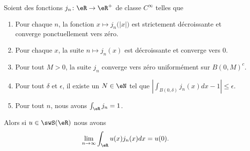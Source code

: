 \begin{lemma}        \label{LEMooHEEOooFtKgfz}
	Soient des fonctions \( j_n\colon \eR\to \eR^+\) de classe \(  C^{\infty}\) telles que
	\begin{enumerate}
		\item
		      Pour chaque \( n\), la fonction \( x\mapsto j_n\big( | x | \big)\) est strictement décroissante et converge ponctuellement vers zéro.
		\item
		      Pour chaque \( x\), la suite \( n\mapsto j_n(x)\) est décroissante et converge vers \( 0\).
		\item       \label{ITEMooFQYXooEkUAIb}
		      Pour tout \( M>0\), la suite \( j_n\) converge vers zéro uniformément sur \( B(0,M)^c\).
		\item       \label{ITEMooFYCRooFeRRjE}
		      Pour tout \( \delta\) et \( \epsilon\), il existe un \( N\in \eN\) tel que \( | \int_{B(0,\delta)}j_n(x)dx-1 |\leq\epsilon\).
		\item
		      Pour tout \( n\), nous avons \( \int_{\eR}j_n=1\).
	\end{enumerate}
	Alors si \( u\in\swS(\eR)\) nous avons
	\begin{equation}
		\lim_{n\to \infty} \int_{\eR}u(x)j_n(x)dx=u(0).
	\end{equation}
\end{lemma}

